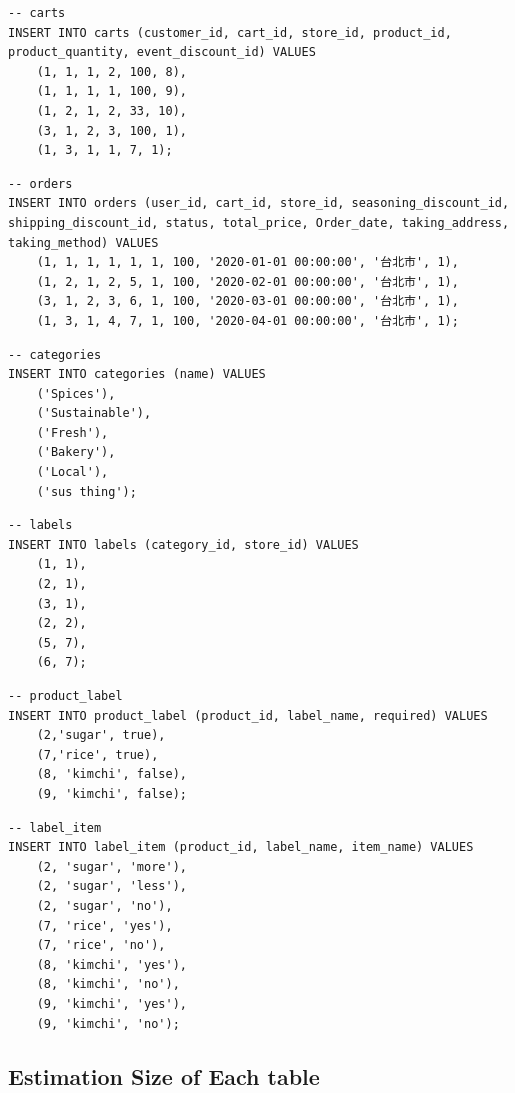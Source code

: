\documentclass[a4paper, 12pt]{article}
\begin{document}
\begin{lstlisting}
-- carts
INSERT INTO carts (customer_id, cart_id, store_id, product_id, product_quantity, event_discount_id) VALUES
    (1, 1, 1, 2, 100, 8),
    (1, 1, 1, 1, 100, 9),
    (1, 2, 1, 2, 33, 10),
    (3, 1, 2, 3, 100, 1),
    (1, 3, 1, 1, 7, 1);
\end{lstlisting}

\begin{lstlisting}
-- orders
INSERT INTO orders (user_id, cart_id, store_id, seasoning_discount_id, shipping_discount_id, status, total_price, Order_date, taking_address, taking_method) VALUES 
    (1, 1, 1, 1, 1, 1, 100, '2020-01-01 00:00:00', '台北市', 1),
    (1, 2, 1, 2, 5, 1, 100, '2020-02-01 00:00:00', '台北市', 1),
    (3, 1, 2, 3, 6, 1, 100, '2020-03-01 00:00:00', '台北市', 1),
    (1, 3, 1, 4, 7, 1, 100, '2020-04-01 00:00:00', '台北市', 1);
\end{lstlisting}

\begin{lstlisting}
-- categories
INSERT INTO categories (name) VALUES
    ('Spices'),
    ('Sustainable'),
    ('Fresh'),
    ('Bakery'),
    ('Local'),
    ('sus thing');
\end{lstlisting}

\begin{lstlisting}
-- labels
INSERT INTO labels (category_id, store_id) VALUES
    (1, 1),
    (2, 1),
    (3, 1),
    (2, 2),
    (5, 7),
    (6, 7);
\end{lstlisting}

\begin{lstlisting}
-- product_label
INSERT INTO product_label (product_id, label_name, required) VALUES
    (2,'sugar', true),
    (7,'rice', true),
    (8, 'kimchi', false),
    (9, 'kimchi', false);
\end{lstlisting}

\begin{lstlisting}
-- label_item
INSERT INTO label_item (product_id, label_name, item_name) VALUES
    (2, 'sugar', 'more'),
    (2, 'sugar', 'less'),
    (2, 'sugar', 'no'),
    (7, 'rice', 'yes'),
    (7, 'rice', 'no'),
    (8, 'kimchi', 'yes'),
    (8, 'kimchi', 'no'),
    (9, 'kimchi', 'yes'),
    (9, 'kimchi', 'no');
\end{lstlisting}

\newpage

\subsection{Estimation Size of Each table}
\end{document}
